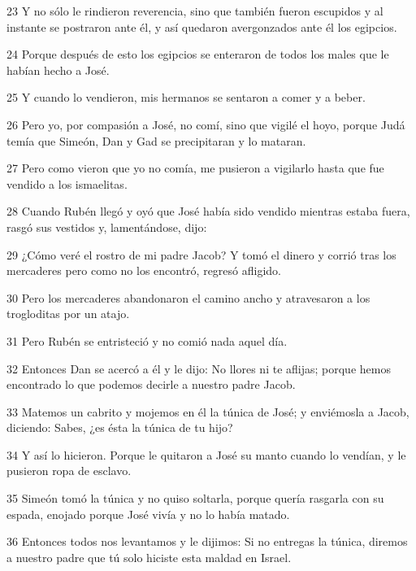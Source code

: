 \par 23 Y no sólo le rindieron reverencia, sino que también fueron escupidos y al instante se postraron ante él, y así quedaron avergonzados ante él los egipcios.

\par 24 Porque después de esto los egipcios se enteraron de todos los males que le habían hecho a José.

\par 25 Y cuando lo vendieron, mis hermanos se sentaron a comer y a beber.

\par 26 Pero yo, por compasión a José, no comí, sino que vigilé el hoyo, porque Judá temía que Simeón, Dan y Gad se precipitaran y lo mataran.

\par 27 Pero como vieron que yo no comía, me pusieron a vigilarlo hasta que fue vendido a los ismaelitas.

\par 28 Cuando Rubén llegó y oyó que José había sido vendido mientras estaba fuera, rasgó sus vestidos y, lamentándose, dijo:

\par 29 ¿Cómo veré el rostro de mi padre Jacob? Y tomó el dinero y corrió tras los mercaderes pero como no los encontró, regresó afligido.

\par 30 Pero los mercaderes abandonaron el camino ancho y atravesaron a los trogloditas por un atajo.

\par 31 Pero Rubén se entristeció y no comió nada aquel día.

\par 32 Entonces Dan se acercó a él y le dijo: No llores ni te aflijas; porque hemos encontrado lo que podemos decirle a nuestro padre Jacob.

\par 33 Matemos un cabrito y mojemos en él la túnica de José; y enviémosla a Jacob, diciendo: Sabes, ¿es ésta la túnica de tu hijo?

\par 34 Y así lo hicieron. Porque le quitaron a José su manto cuando lo vendían, y le pusieron ropa de esclavo.

\par 35 Simeón tomó la túnica y no quiso soltarla, porque quería rasgarla con su espada, enojado porque José vivía y no lo había matado.

\par 36 Entonces todos nos levantamos y le dijimos: Si no entregas la túnica, diremos a nuestro padre que tú solo hiciste esta maldad en Israel.

